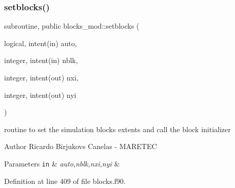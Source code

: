 \subsubsection{\texorpdfstring{setblocks()}{setblocks()}}
{\footnotesize\ttfamily subroutine, public blocks\+\_\+mod\+::setblocks (\begin{DoxyParamCaption}\item[{logical, intent(in)}]{auto,  }\item[{integer, intent(in)}]{nblk,  }\item[{integer, intent(out)}]{nxi,  }\item[{integer, intent(out)}]{nyi }\end{DoxyParamCaption})}



routine to set the simulation blocks extents and call the block initializer 

\begin{DoxyAuthor}{Author}
Ricardo Birjukovs Canelas -\/ M\+A\+R\+E\+T\+EC 
\end{DoxyAuthor}

\begin{DoxyParams}[1]{Parameters}
\mbox{\tt in}  & {\em auto,nblk,nxi,nyi} & \\
\hline
\end{DoxyParams}


Definition at line 409 of file blocks.\+f90.



